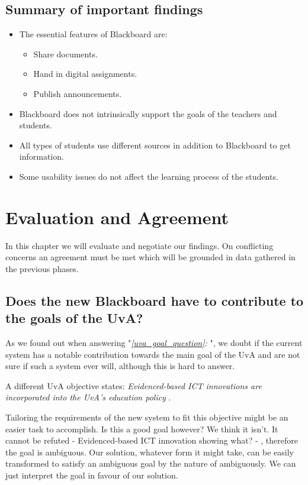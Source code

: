 \section{Summary of important findings}
\begin{itemize}
	\item The essential features of Blackboard are:
	\begin{itemize}
		\item Share documents.
		\item Hand in digital assignments.
		\item Publish announcements.
	\end{itemize}
	\item Blackboard does not intrinsically support the goals of the teachers and students.
	\item All types of students use different sources in addition to Blackboard to get information.
	\item Some usability issues do not affect the learning process of the students.
\end{itemize}


\chapter{Evaluation and Agreement}
In this chapter we will evaluate and negotiate our findings. On conflicting concerns an agreement must be met which will be grounded in data gathered in the previous phases.
\section{Does the new Blackboard have to contribute to the goals of the UvA?}
As we found out when answering "\emph{\ref{uva_goal_question}: }", we doubt if the current system has a notable contribution towards the main goal of the UvA and are not sure if such a system ever will, although this is hard to answer.

A different UvA objective states: \emph{Evidenced-based ICT innovations are	incorporated into the UvA’s education policy} \cite{uva_strategic_plan}.

Tailoring the requirements of the new system to fit this objective might be an easier task to accomplish. Is this a good goal however? We think it isn't. It cannot be refuted - Evidenced-based ICT innovation showing what? - , therefore the goal is ambiguous. Our solution, whatever form it might take, can be easily transformed to satisfy an ambiguous goal by the nature of ambiguously. We can just interpret the goal in favour of our solution. 

